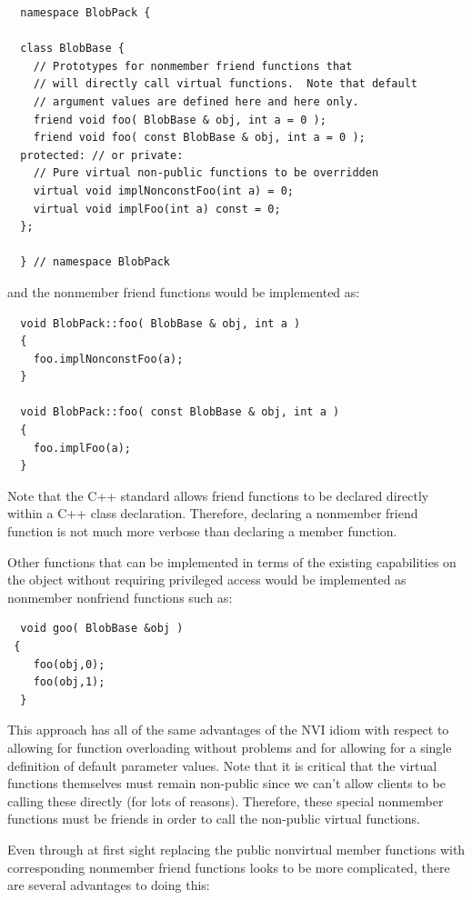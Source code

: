 \documentclass[pdf,ps2pdf,11pt]{SANDreport}
\begin{document}
{\small\begin{verbatim}
  namespace BlobPack {

  class BlobBase {
    // Prototypes for nonmember friend functions that
    // will directly call virtual functions.  Note that default
    // argument values are defined here and here only.
    friend void foo( BlobBase & obj, int a = 0 );
    friend void foo( const BlobBase & obj, int a = 0 );
  protected: // or private:
    // Pure virtual non-public functions to be overridden
    virtual void implNonconstFoo(int a) = 0;
    virtual void implFoo(int a) const = 0;
  };

  } // namespace BlobPack
\end{verbatim}}

{}\noindent{}and the nonmember friend functions would be implemented as:

{\small\begin{verbatim}
  void BlobPack::foo( BlobBase & obj, int a )
  {
    foo.implNonconstFoo(a);
  }

  void BlobPack::foo( const BlobBase & obj, int a )
  {
    foo.implFoo(a);
  }
\end{verbatim}}

Note that the C++ standard allows friend functions to be declared directly
within a C++ class declaration.  Therefore, declaring a nonmember friend
function is not much more verbose than declaring a member function.

Other functions that can be implemented in terms of the existing capabilities
on the object without requiring privileged access would be implemented as
nonmember nonfriend functions such as:

{\small\begin{verbatim}
  void goo( BlobBase &obj )
 {
    foo(obj,0);
    foo(obj,1);
  }
\end{verbatim}}

This approach has all of the same advantages of the NVI idiom with respect to
allowing for function overloading without problems and for allowing for a
single definition of default parameter values.  Note that it is critical that
the virtual functions themselves must remain non-public since we can't allow
clients to be calling these directly (for lots of reasons).  Therefore, these
special nonmember functions must be friends in order to call the non-public
virtual functions.

Even through at first sight replacing the public nonvirtual member functions
with corresponding nonmember friend functions looks to be more complicated,
there are several advantages to doing this:
\end{document}
